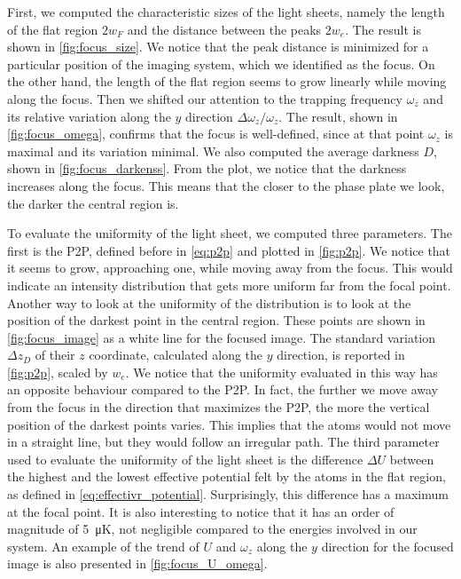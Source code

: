 First, we computed the characteristic sizes of the light sheets, namely the length of the flat region $2w_F$ and the distance between the peaks $2w_e$. The result is shown in \cref{fig:focus_size}. We notice that the peak distance is minimized for a particular position of the imaging system, which we identified as the focus. On the other hand, the length of the flat region seems to grow linearly while moving along the focus. Then we shifted our attention to the trapping frequency $\omega_z$ and its relative variation along the $y$ direction $\Delta \omega_z/\omega_z$. The result, shown in \cref{fig:focus_omega}, confirms that the focus is well-defined, since at that point $\omega_z$ is maximal and its variation minimal. We also computed the average darkness $D$, shown in \cref{fig:focus_darkenss}. From the plot, we notice that the darkness increases along the focus. This means that the closer to the phase plate we look, the darker the central region is.

To evaluate the uniformity of the light sheet, we computed three parameters. The first is the P2P, defined before in \cref{eq:p2p} and plotted in \cref{fig:p2p}. We notice that it seems to grow, approaching one, while moving away from the focus. This would indicate an intensity distribution that gets more uniform far from the focal point. Another way to look at the uniformity of the distribution is to look at the position of the darkest point in the central region. These points are shown in \cref{fig:focus_image} as a white line for the focused image. The standard variation $\Delta z_D$ of their $z$ coordinate, calculated along the $y$ direction, is reported in \cref{fig:p2p}, scaled by $w_e$. We notice that the uniformity evaluated in this way has an opposite behaviour compared to the P2P. In fact, the further we move away from the focus in the direction that maximizes the P2P, the more the vertical position of the darkest points varies. This implies that the atoms would not move in a straight line, but they would follow an irregular path. The third parameter used to evaluate the uniformity of the light sheet is the difference $\Delta U$ between the highest and the lowest effective potential felt by the atoms in the flat region, as defined in \cref{eq:effectivr_potential}. Surprisingly, this difference has a maximum at the focal point. It is also interesting to notice that it has an order of magnitude of \SI{5}{\micro K}, not negligible compared to the energies involved in our system. An example of the trend of $U$ and $\omega_z$ along the $y$ direction for the focused image is also presented in \cref{fig:focus_U_omega}.


